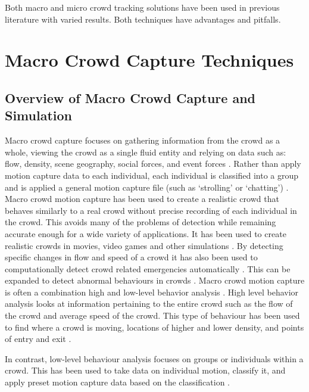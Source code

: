 \documentclass[12pt, twocolumn, conference]{IEEEtran}
\begin{document}
Both macro and micro crowd tracking solutions have been used in previous literature with varied results. Both techniques have advantages and pitfalls. 

\section{Macro Crowd Capture Techniques}

\subsection{Overview of Macro Crowd Capture and Simulation}

Macro crowd capture focuses on gathering information from the crowd as a whole, viewing the crowd as a single fluid entity and relying on data such as: flow, density, scene geography, social forces, and event forces \cite{N. Courty}\cite{B. Boghossian}\cite{R. Mehran}\cite{S. Saxena}. Rather than apply motion capture data to each individual, each individual is classified into a group and is applied a general motion capture file (such as ‘strolling’ or ‘chatting’) \cite{K. Lee}. Macro crowd motion capture has been used to create a realistic crowd that behaves similarly to a real crowd without precise recording of each individual in the crowd. This avoids many of the problems of detection while remaining accurate enough for a wide variety of applications. It has been used to create realistic crowds in movies, video games and other simulations \cite{N. Courty}\cite{R. Mehran}. By detecting specific changes in flow and speed of a crowd it has also been used to computationally detect crowd related emergencies automatically \cite{B. Boghossian}. This can be expanded to detect abnormal behaviours in crowds \cite{S. Saxena}.
Macro crowd motion capture is often a combination high and low-level behavior analysis \cite{K. Lee}. High level behavior analysis looks at information pertaining to the entire crowd such as the flow of the crowd and average speed of the crowd. This type of behaviour has been used to find where a crowd is moving, locations of higher and lower density, and points of entry and exit \cite{N. Courty}\cite{B. Boghossian}\cite{R. Mehran}\cite{M. Rodriguez}.

In contrast, low-level behaviour analysis focuses on groups or individuals within a crowd. This has been used to take data on individual motion, classify it, and apply preset motion capture data based on the classification \cite{K. Lee}\cite{S. Saxena}. 
\end{document}
